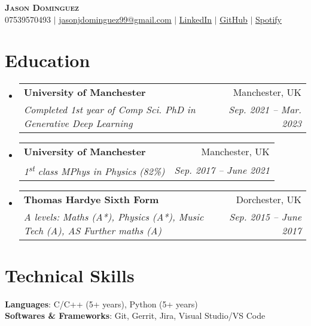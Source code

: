 \documentclass[letterpaper,11pt]{article}
\makeatletter
\newcommand{\resumeSubheading}[4]{
  \vspace{-2pt}\item
    \begin{tabular*}{0.97\textwidth}[t]{l@{\extracolsep{\fill}}r}
      \textbf{#1} & #2 \\
      \textit{\small#3} & \textit{\small #4} \\
    \end{tabular*}\vspace{-7pt}
}
\newcommand{\resumeSubHeadingListStart}{\begin{itemize}[leftmargin=0.15in, label={}]}
\newcommand{\resumeSubHeadingListEnd}{\end{itemize}}
\makeatother
\begin{document}

\begin{center}
    \textbf{\Huge \scshape Jason Dominguez} \\ \vspace{1pt}
    \small 07539570493 $|$ \href{mailto:jasonjdominguez99@gmail.com}{\underline{jasonjdominguez99@gmail.com}} $|$ 
    \href{https://www.linkedin.com/in/jasonjdominguez99/}{\underline{LinkedIn}} $|$
    \href{https://github.com/jasonjdominguez99}{\underline{GitHub}} $|$
    \href{https://open.spotify.com/artist/6vROqVU2bVHOp3V4q09ljN?si=fedCBXksTGm1AKXGwlDVHA}{\underline{Spotify}}
\end{center}


\section{Education}
  \resumeSubHeadingListStart
    \resumeSubheading
      {University of Manchester}{Manchester, UK}
      {Completed 1st year of Comp Sci. PhD in Generative Deep Learning}{Sep. 2021 -- Mar. 2023}
    \resumeSubheading
      {University of Manchester}{Manchester, UK}
      {1\textsuperscript{st} class MPhys in Physics (82\%)}{Sep. 2017 -- June 2021}
    \resumeSubheading
      {Thomas Hardye Sixth Form}{Dorchester, UK}
      {A levels: Maths (A*), Physics (A*), Music Tech (A), AS Further maths (A)}{Sep. 2015 -- June 2017}
  \resumeSubHeadingListEnd

\section{Technical Skills}
 \begin{itemize}[leftmargin=0.15in, label={}]
    \small{\item{
     \textbf{Languages}{: C/C++ (5+ years), Python (5+ years)} \\
     \textbf{Softwares \& Frameworks}{: Git, Gerrit, Jira, Visual Studio/VS Code} \\
     
    }}
 \end{itemize}
 
\end{document}
